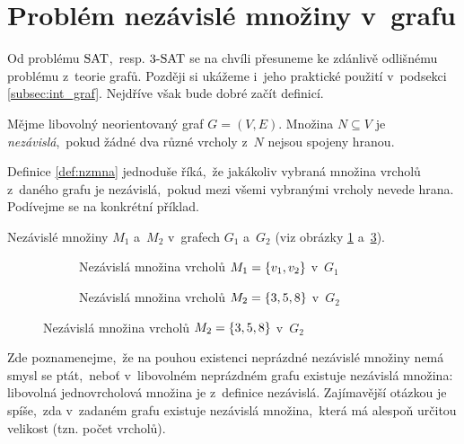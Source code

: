 \section{Problém nezávislé množiny v~grafu}\label{sec:nzmna}

Od problému \ensuremath{\SAT},~resp. \ensuremath{\THREESAT} se na chvíli přesuneme ke zdánlivě odlišnému problému z~teorie grafů. Později si ukážeme i~jeho praktické použití v~podsekci \ref{subsec:int_graf}. Nejdříve však bude dobré začít definicí.
\begin{definition}\label{def:nzmna}
    Mějme libovolný neorientovaný graf $G=(V,E)$. Množina $N\subseteq V$ je \emph{nezávislá},~pokud žádné dva různé vrcholy z~$N$ nejsou spojeny hranou.
\end{definition}
Definice \ref{def:nzmna} jednoduše říká,~že jakákoliv vybraná množina vrcholů z~daného grafu je nezávislá,~pokud mezi všemi vybranými vrcholy nevede hrana. Podívejme se na konkrétní příklad.
\begin{example}
    Nezávislé množiny $M_1$ a~$M_2$ v~grafech $G_1$ a~$G_2$ (viz obrázky \ref{subfig:nzmna_priklad1} a~\ref{subfig:nzmna_priklad2}).
    \begin{figure}[ht]
        \centering
        \begin{subfigure}{7cm}
            \centering
            
            \caption{Nezávislá množina vrcholů $M_1=\left\{v_1,v_2\right\}$ v~$G_1$}
            \label{subfig:nzmna_priklad1}
        \end{subfigure}
        \qquad
        \begin{subfigure}{7cm}
            \centering
            
            \caption{Nezávislá množina vrcholů $M_2=\left\{3,5,8\right\}$ v~$G_2$}
            \label{subfig:nzmna_priklad2}
        \end{subfigure}
    \end{figure}
\end{example}

Zde poznamenejme,~že na pouhou existenci neprázdné nezávislé množiny nemá smysl se ptát,~neboť v~libovolném neprázdném grafu existuje nezávislá množina: libovolná jednovrcholová množina je z~definice nezávislá. Zajímavější otázkou je spíše,~zda v~zadaném grafu existuje nezávislá množina,~která má alespoň určitou velikost (tzn. počet vrcholů).


